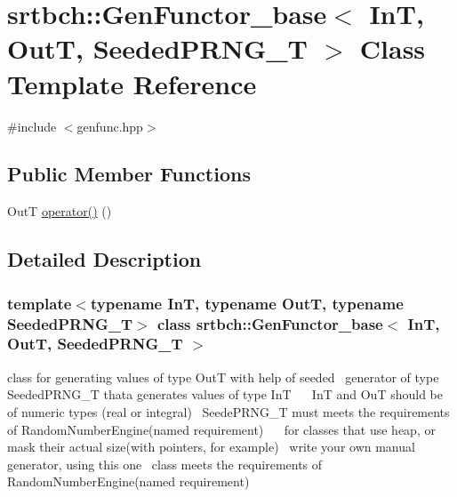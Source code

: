 \hypertarget{classsrtbch_1_1GenFunctor__base}{}\section{srtbch\+:\+:Gen\+Functor\+\_\+base$<$ InT, OutT, Seeded\+P\+R\+N\+G\+\_\+T $>$ Class Template Reference}
\label{classsrtbch_1_1GenFunctor__base}


{\ttfamily \#include $<$genfunc.\+hpp$>$}

\subsection*{Public Member Functions}
\begin{DoxyCompactItemize}
\item 
OutT \hyperlink{classsrtbch_1_1GenFunctor__base_a3d2458d897cc2eff6f0206241afec80b}{operator()} ()
\end{DoxyCompactItemize}


\subsection{Detailed Description}
\subsubsection*{template$<$typename InT, typename OutT, typename Seeded\+P\+R\+N\+G\+\_\+T$>$\newline
class srtbch\+::\+Gen\+Functor\+\_\+base$<$ In\+T, Out\+T, Seeded\+P\+R\+N\+G\+\_\+\+T $>$}

class for generating values of type OutT with help of seeded~\newline
generator of type Seeded\+P\+R\+N\+G\+\_\+T thata generates values of type InT~\newline
~\newline
 InT and OuT should be of numeric types (real or integral)~\newline
Seede\+P\+R\+N\+G\+\_\+T must meets the requirements of Random\+Number\+Engine(named requirement)~\newline
~\newline
 for classes that use heap, or mask their actual size(with pointers, for example)~\newline
write your own manual generator, using this one~\newline
class meets the requirements of Random\+Number\+Engine(named requirement) 

